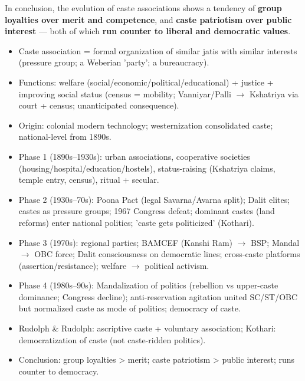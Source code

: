 \begin{CriticalPoint}
In conclusion, the evolution of caste associations shows a tendency of \textbf{group loyalties over merit and competence}, and \textbf{caste patriotism over public interest} --- both of which \textbf{run counter to liberal and democratic values}.
\end{CriticalPoint}

\begin{QuickRevision}
\begin{itemize}
\item Caste association = formal organization of similar jatis with similar interests (pressure group; a Weberian 'party'; a bureaucracy).
\item Functions: welfare (social/economic/political/educational) + justice + improving social status (census = mobility; Vanniyar/Palli $\rightarrow$ Kshatriya via court + census; unanticipated consequence).
\item Origin: colonial modern technology; westernization consolidated caste; national-level from 1890s.
\item Phase 1 (1890s--1930s): urban associations, cooperative societies (housing/hospital/education/hostels), status-raising (Kshatriya claims, temple entry, census), ritual + secular.
\item Phase 2 (1930s--70s): Poona Pact (legal Savarna/Avarna split); Dalit elites; castes as pressure groups; 1967 Congress defeat; dominant castes (land reforms) enter national politics; 'caste gets politicized' (Kothari).
\item Phase 3 (1970s): regional parties; BAMCEF (Kanshi Ram) $\rightarrow$ BSP; Mandal $\rightarrow$ OBC force; Dalit consciousness on democratic lines; cross-caste platforms (assertion/resistance); welfare $\rightarrow$ political activism.
\item Phase 4 (1980s--90s): Mandalization of politics (rebellion vs upper-caste dominance; Congress decline); anti-reservation agitation united SC/ST/OBC but normalized caste as mode of politics; democracy of caste.
\item Rudolph \& Rudolph: ascriptive caste + voluntary association; Kothari: democratization of caste (not caste-ridden politics).
\item Conclusion: group loyalties > merit; caste patriotism > public interest; runs counter to democracy.
\end{itemize}
\end{QuickRevision}

